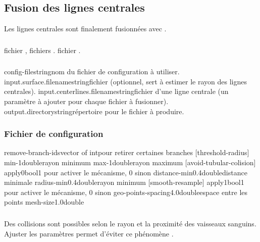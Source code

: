 	\subsection{Fusion des lignes centrales}

Les lignes centrales sont finalement fusionnées avec .

	\subsubsection{\ioT}

\iolist
{fichier \stl, fichiers \vtk.}
{fichier \vtk.}


	\subsubsection{\argsT}

\args
{config-file}{}{string}{nom du fichier de configuration à utiliser.}
{input.surface.filename}{}{string}{fichier \stl (optionnel, sert à estimer le rayon des lignes centrales).}
{input.centerlines.filename}{}{string}{fichier \vtk d'une ligne centrale (un paramètre à ajouter pour chaque fichier à fusionner).}
{output.directory}{}{string}{répertoire pour le fichier \vtk à produire.}
\stoparg


	\subsubsection{Fichier de configuration}

\configfile
{remove-branch-ids}{}{vector of int}{pour retirer certaines branches}
{[threshold-radius]}{}{}{}
{min}{-1}{double}{rayon minimum}
{max}{-1}{double}{rayon maximum}
{[avoid-tubular-colision]}{}{}{}
{apply}{0}{bool}{1 pour activer le mécanisme, 0 sinon}
{distance-min}{0.4}{double}{distance minimale}
{radius-min}{0.4}{double}{rayon minimum}
{[smooth-resample]}{}{}{}
{apply}{1}{bool}{1 pour activer le mécanisme, 0 sinon}
{geo-points-spacing}{4.0}{double}{espace entre les points}
{mesh-size}{1.0}{double}{}
\stopfile

	\subsubsection{\etatg}
	
Des collisions sont possibles selon le rayon et la proximité des vaisseaux sanguins. Ajuster les paramètres  permet d'éviter ce phénomène \tbv.

